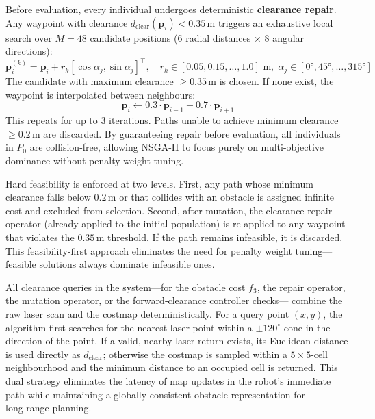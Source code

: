 \documentclass[lettersize,journal]{IEEEtran}
\begin{document}
Before evaluation, every individual undergoes deterministic \textbf{clearance 
repair}. Any waypoint with clearance $d_{\mathrm{clear}}(\mathbf{p}_i) < 0.35$\,m 
triggers an exhaustive local search over $M = 48$ candidate positions (6 radial 
distances $\times$ 8 angular directions):
\begin{equation}
  \mathbf{p}_i^{(k)} = \mathbf{p}_i + r_k [\cos\alpha_j, \sin\alpha_j]^\top,
  \quad r_k \in [0.05, 0.15, \ldots, 1.0]\text{ m},\;
  \alpha_j \in [0°, 45°, \ldots, 315°]
  \label{eq:repair_candidates}
\end{equation}
The candidate with maximum clearance $\geq 0.35$\,m is chosen. If none exist, 
the waypoint is interpolated between neighbours:
\begin{equation}
  \mathbf{p}_i \leftarrow 0.3 \cdot \mathbf{p}_{i-1} + 0.7 \cdot \mathbf{p}_{i+1}
  \label{eq:repair_fallback}
\end{equation}
This repeats for up to 3 iterations. Paths unable to achieve minimum clearance 
$\geq 0.2$\,m are discarded. By guaranteeing repair before evaluation, all 
individuals in $P_0$ are collision-free, allowing NSGA-II to focus purely on 
multi-objective dominance without penalty-weight tuning.

Hard feasibility is enforced at two levels. First, any path whose minimum
clearance falls below $0.2$\,m or that collides with an obstacle is assigned
infinite cost and excluded from selection. Second, after mutation, the
clearance‑repair operator (already applied to the initial population) is
re‑applied to any waypoint that violates the $0.35$\,m threshold. If the
path remains infeasible, it is discarded. This feasibility‑first approach
eliminates the need for penalty weight tuning—feasible solutions always
dominate infeasible ones.

All clearance queries in the system—for the obstacle cost $f_3$, the repair
operator, the mutation operator, or the forward‑clearance controller checks—
combine the raw laser scan and the costmap deterministically. For a query
point $(x,y)$, the algorithm first searches for the nearest laser point within
a $\pm 120^\circ$ cone in the direction of the point. If a valid, nearby laser
return exists, its Euclidean distance is used directly as
$d_{\mathrm{clear}}$; otherwise the costmap is sampled within a $5\times5$-cell
neighbourhood and the minimum distance to an occupied cell is returned. This
dual strategy eliminates the latency of map updates in the robot’s immediate
path while maintaining a globally consistent obstacle representation for
long‑range planning.
\end{document}
